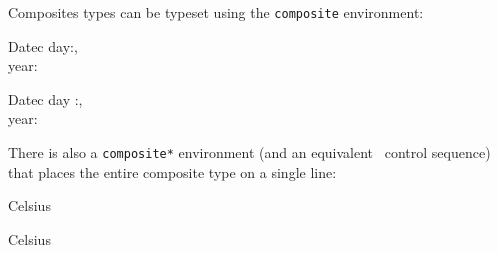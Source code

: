 \documentclass{article}
\newlength{\righthalf} \setlength{\righthalf}{0.5\textwidth}
\newlength{\lefthalf}  \setlength{\lefthalf}{0.4\textwidth}
\newenvironment{leftside}{\noindent\hspace{0.1\textwidth}%
                          \minipage[t]{\lefthalf}\vspace{10pt}%
                          \noindent\begin{vdm}\leftskip=0pt\VDMindent=0pt}%
                         {\end{vdm}\endminipage}
\newenvironment{rightside}{\minipage[t]{\righthalf}\verbatim}%
                          {\endverbatim\endminipage}
\renewcommand{\^}[1]{$\langle${\rm #1\/}$\rangle$}
\newcommand{\cs}[1]{\leavevmode\hbox{\tt \string#1}}
\begin{document}
\noindent\begin{minipage}{\textwidth}\begin{leftside}
\end{leftside}%
\begin{rightside}
\end{rightside}
\end{minipage}

Composites types can be typeset using the {\tt composite} environment:

\noindent\begin{minipage}{\textwidth}\begin{leftside}
  \begin{composite}{Datec}
    day:, \\
    year:
  \end{composite}
\end{leftside}%
\begin{rightside}
\begin{composite}{Datec}
  day :, \\
  year:
\end{composite}
\end{rightside}
\end{minipage}

There is also a {\tt composite*} environment (and an equivalent
\cs\scompose\ control sequence) that places the entire composite
type on a single line:

\noindent\begin{minipage}{\textwidth}\begin{leftside}
  \begin{composite*}{Celsius}
    \Real
  \end{composite*}
\end{leftside}%
\begin{rightside}
\begin{composite*}{Celsius}
  \Real
\end{composite*}
\end{rightside}
\end{minipage}

\noindent\begin{minipage}{\textwidth}\begin{leftside}
\end{leftside}%
\begin{rightside}
\end{rightside}
\end{minipage}
\end{document}
